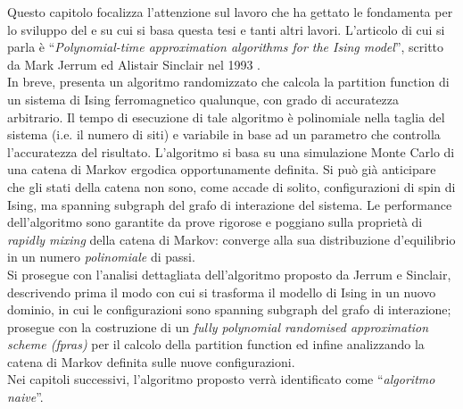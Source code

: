 Questo capitolo focalizza l'attenzione sul lavoro che ha gettato le fondamenta per lo sviluppo del e su cui si basa questa tesi e tanti altri lavori. L'articolo di cui si parla è ``\textit{Polynomial-time approximation algorithms for the Ising model}'', scritto da Mark Jerrum ed Alistair Sinclair nel 1993 \cite{jerrum1993polynomial}.\\
In breve, \cite{jerrum1993polynomial} presenta un algoritmo randomizzato che calcola la partition function di un sistema di Ising ferromagnetico qualunque, con grado di accuratezza arbitrario. Il tempo di esecuzione di tale algoritmo è polinomiale nella taglia del sistema (i.e. il numero di siti) e variabile in base ad un parametro che controlla l'accuratezza del risultato.
L'algoritmo si basa su una simulazione Monte Carlo di una catena di Markov ergodica opportunamente definita. Si può già anticipare che gli stati della catena non sono, come accade di solito, configurazioni di spin di Ising, ma spanning subgraph del grafo di interazione del sistema. Le performance dell'algoritmo sono garantite da prove rigorose e poggiano sulla proprietà di \textit{rapidly mixing} della catena di Markov: converge alla sua distribuzione d'equilibrio in un numero \textit{polinomiale} di passi.\\
Si prosegue con l'analisi dettagliata dell'algoritmo proposto da Jerrum e Sinclair, descrivendo prima il modo con cui si trasforma il modello di Ising in un nuovo dominio, in cui le configurazioni sono spanning subgraph del grafo di interazione; prosegue con la costruzione di un \textit{fully polynomial randomised approximation scheme (fpras)} per il calcolo della partition function ed infine analizzando la catena di Markov definita sulle nuove configurazioni.\\
Nei capitoli successivi, l'algoritmo proposto verrà identificato come ``\textit{algoritmo naive}''.
